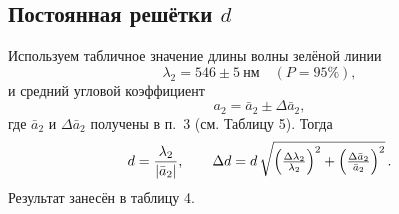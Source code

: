 \subsection*{Постоянная решётки \(d\)}

Используем табличное значение длины волны зелёной линии
\[
	\lambda_2 = 546 \pm 5\ \text{нм}\quad(P=95\%),
\]
и средний угловой коэффициент
\[
	a_2 = \bar a_2 \pm \Delta\bar a_2,
\]
где \(\bar a_2\) и \(\Delta\bar a_2\) получены в п.~3 (см. Таблицу 5).
Тогда
\[
	d = \frac{\lambda_2}{\lvert \bar a_2\rvert},
	\qquad
	\Delta d = d \,
	\sqrt{\Bigl(\tfrac{\Delta \lambda_2}{\lambda_2}\Bigr)^2
		+\Bigl(\tfrac{\Delta \bar a_2}{\bar a_2}\Bigr)^2}\,.
\]
Результат занесён в таблицу 4.

